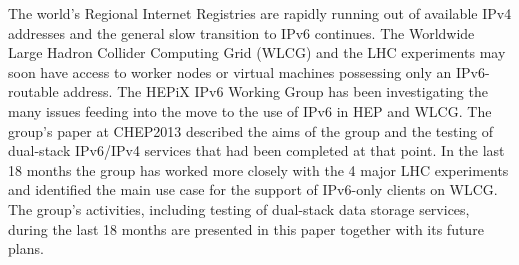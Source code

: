 The world's Regional Internet Registries are rapidly running out of available IPv4 addresses and the 
general slow transition to IPv6 continues. The Worldwide Large Hadron Collider Computing Grid (WLCG) and the LHC experiments 
may soon have access to worker nodes or virtual machines possessing only an IPv6-routable address. The HEPiX
IPv6 Working Group \cite{ipv6wg} has been investigating the many issues feeding into the move to the use of IPv6 in HEP and WLCG.
The group's paper at CHEP2013 \cite{ipv6chep2013} described the aims of the group and the testing of dual-stack IPv6/IPv4 
services that had been completed at that point. In the last 18 months the group has worked more closely with the
4 major LHC experiments and identified the main use case for the support of IPv6-only clients on WLCG. The group's
activities, including testing of dual-stack data storage services, during the last 18 months are presented in this 
paper together with its future plans.